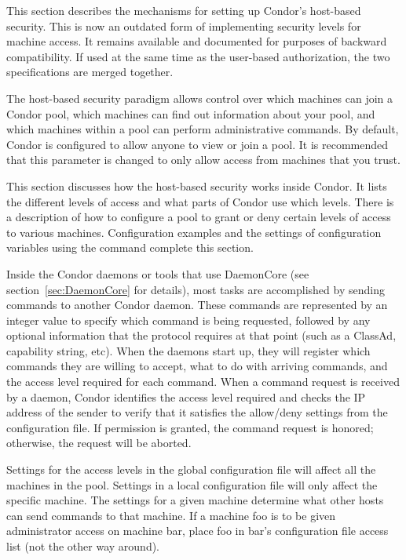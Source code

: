 This section describes the mechanisms for setting up Condor's
host-based security.
This is now an outdated form of implementing security
levels for machine access.
It remains available and documented for purposes of backward compatibility.
If used at the same time as the user-based authorization,
the two specifications are merged together.

The host-based security paradigm allows control over which machines can
join a Condor pool, which machines can find out information about
your pool, and which machines within a pool can perform
administrative commands.  By default, Condor is configured to allow
anyone to view or join a pool. It is recommended that this parameter is changed
to only allow access from machines that you trust.

This section discusses how the host-based security works inside Condor.
It lists the different levels of access and what
parts of Condor use which levels.
There is a description of how to configure
a pool to grant or deny certain levels of access to various
machines.
Configuration examples and the settings of configuration variables
using the  command complete this section.

Inside the Condor daemons or tools that use DaemonCore (see
section~\ref{sec:DaemonCore} for details), most
tasks are accomplished by sending commands to another Condor daemon.
These commands are represented by an integer value to specify which command
is being requested, followed
by any optional information that the protocol requires at that point
(such as a ClassAd, capability string, etc).
When the daemons start up,
they will register which commands they are willing to accept, what to
do with arriving commands, and the access level required for
each command.
When a command request is received by a daemon, Condor identifies the  access level
required and checks the IP address of the sender to verify that
it satisfies the allow/deny settings
from the configuration file.
If permission is granted, the command request is honored;
otherwise, the request will be aborted.

Settings for the access levels in the global
configuration file will affect all the machines in the pool.
Settings in a local configuration file will only affect the specific machine.
The settings for a given machine determine what other hosts can send
commands to that machine.
If a machine foo is to be given
administrator access on machine bar, place foo in
bar's configuration file access list (not the other way around).



